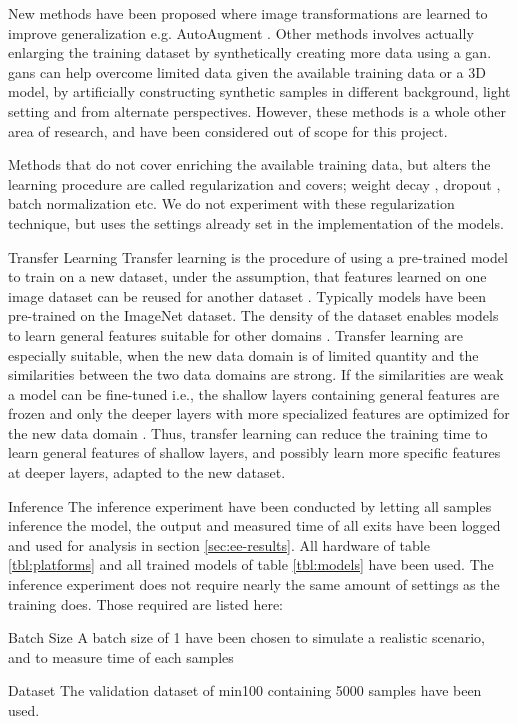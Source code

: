 \begin{enumdescript}
\begin{enumdescript}
		New methods have been proposed where image transformations are learned to improve generalization e.g. AutoAugment \cite{cubuk_autoaugment:_2018}. Other methods involves actually enlarging the training dataset by synthetically creating more data using a \gls{gan}. \gls{gan}s can help overcome limited data given the available training data or a 3D model, by artificially constructing synthetic samples in different background, light setting and from alternate perspectives. However, these methods is a whole other area of research, and have been considered out of scope for this project.
		
		Methods that do not cover enriching the available training data, but alters the learning procedure are called regularization and covers; weight decay \cite{krogh_simple_nodate}, dropout \cite{srivastava_dropout:_nodate}, batch normalization \cite{ioffe_batch_2015} etc. We do not experiment with these regularization technique, but uses the settings already set in the implementation of the models.
		
		\item[Transfer Learning] Transfer learning is the procedure of using a pre-trained model to train on a new dataset, under the assumption, that features learned on one image dataset can be reused for another dataset \cite{yosinski_how_2014}. Typically models have been pre-trained on the ImageNet dataset. The density of the dataset enables models to learn general features suitable for other domains \cite{kornblith_better_2019}. Transfer learning are especially suitable, when the new data domain is of limited quantity and the similarities between the two data domains are strong. If the similarities are weak a model can be fine-tuned i.e., the shallow layers containing general features are frozen and only the deeper layers with more specialized features are optimized for the new data domain \cite{li_cs231n:_2018}. Thus, transfer learning can reduce the training time to learn general features of shallow layers, and possibly learn more specific features at deeper layers, adapted to the new dataset.
	\end{enumdescript}
	
	\item[Inference] The inference experiment have been conducted by letting all samples inference the model, the output and measured time of all exits have been logged and used for analysis in section \ref{sec:ee-results}. All hardware of table \ref{tbl:platforms} and all trained models of table \ref{tbl:models} have been used. The inference experiment does not require nearly the same amount of settings as the training does. Those required are listed here:
	\begin{enumdescript}
		\item[Batch Size] A batch size of 1 have been chosen to simulate a realistic scenario, and to measure time of each samples
		\item[Dataset] The validation dataset of \gls{min100} containing 5000 samples have been used.
	\end{enumdescript} 
	
\end{enumdescript}

